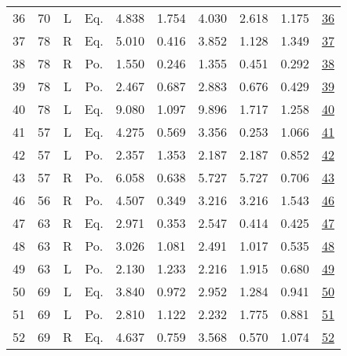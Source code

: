 \begin{table}[tbp]
\begin{tabular}{rrccrrrrrr}
    36 &   70 &   L &    Eq. &       4.838 &       1.754 &       4.030 &       2.618 &       1.175 & \href{https://youtu.be/yC_xlViGrnU}{36} \\
    37 &   78 &   R &    Eq. &       5.010 &       0.416 &       3.852 &       1.128 &       1.349 & \href{https://youtu.be/rgSV4-ipICs}{37} \\
    38 &   78 &   R &    Po. &       1.550 &       0.246 &       1.355 &       0.451 &       0.292 & \href{https://youtu.be/EuBiefLx5pU}{38} \\
    39 &   78 &   L &    Po. &       2.467 &       0.687 &       2.883 &       0.676 &       0.429 & \href{https://youtu.be/oq5uIwL-c2I}{39} \\
    40 &   78 &   L &    Eq. &       9.080 &       1.097 &       9.896 &       1.717 &       1.258 & \href{https://youtu.be/OviFdIpljEc}{40} \\
    41 &   57 &   L &    Eq. &       4.275 &       0.569 &       3.356 &       0.253 &       1.066 & \href{https://youtu.be/X5OCQCRT2Tk}{41} \\
    42 &   57 &   L &    Po. &       2.357 &       1.353 &       2.187 &       2.187 &       0.852 & \href{https://youtu.be/bOvpgijdLf4}{42} \\
    43 &   57 &   R &    Po. &       6.058 &       0.638 &       5.727 &       5.727 &       0.706 & \href{https://youtu.be/CELZeKhrx30}{43} \\
    46 &   56 &   R &    Po. &       4.507 &       0.349 &       3.216 &       3.216 &       1.543 & \href{https://youtu.be/_eaQCA1x_wI}{46} \\
    47 &   63 &   R &    Eq. &       2.971 &       0.353 &       2.547 &       0.414 &       0.425 & \href{https://youtu.be/xMAyQwgvR3g}{47} \\
    48 &   63 &   R &    Po. &       3.026 &       1.081 &       2.491 &       1.017 &       0.535 & \href{https://youtu.be/HwOLFxpDRYk}{48} \\
    49 &   63 &   L &    Po. &       2.130 &       1.233 &       2.216 &       1.915 &       0.680 & \href{https://youtu.be/mEUKT-Z1GqU}{49} \\
    50 &   69 &   L &    Eq. &       3.840 &       0.972 &       2.952 &       1.284 &       0.941 & \href{https://youtu.be/xAZWQ-aU9H4}{50} \\
    51 &   69 &   L &    Po. &       2.810 &       1.122 &       2.232 &       1.775 &       0.881 & \href{https://youtu.be/8jI-QrRbOQo}{51} \\
    52 &   69 &   R &    Eq. &       4.637 &       0.759 &       3.568 &       0.570 &       1.074 & \href{https://youtu.be/YoL-9l7UtpU}{52} \\
    \bottomrule
    \end{tabular}
\end{table}